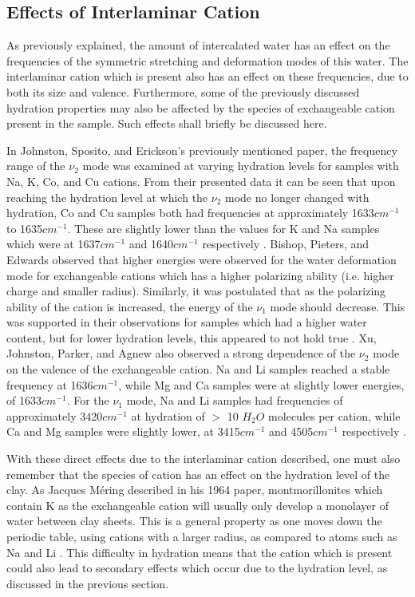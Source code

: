 \subsection{Effects of Interlaminar Cation}
As previously explained, the amount of intercalated water has an effect on the frequencies of the symmetric stretching and deformation modes of this water. The interlaminar cation which is present also has an effect on these frequencies, due to both its size and valence. Furthermore, some of the previously discussed hydration properties may also be affected by the species of exchangeable cation present in the sample. Such effects shall briefly be discussed here.

In Johnston, Sposito, and Erickson's previously mentioned paper, the frequency range of the $\nu_2$ mode was examined at varying hydration levels for samples with Na, K, Co, and Cu cations. From their presented data it can be seen that upon reaching the hydration level at which the $\nu_2$ mode no longer changed with hydration, Co and Cu samples both had frequencies at approximately 1633$cm^{-1}$ to 1635$cm^{-1}$. These are slightly lower than the values for K and Na samples which were at 1637$cm^{-1}$ and 1640$cm^{-1}$ respectively \cite{johnston1992vibrational}. Bishop, Pieters, and Edwards observed that higher energies were observed for the water deformation mode for exchangeable cations which has a higher polarizing ability (i.e. higher charge and smaller radius). Similarly, it was postulated that as the polarizing ability of the cation is increased, the energy of the $\nu_1$ mode should decrease. This was supported in their observations for samples which had a higher water content, but for lower hydration levels, this appeared to not hold true \cite{bishop1994infrared}. Xu, Johnston, Parker, and Agnew also observed a strong dependence of the $\nu_2$ mode on the valence of the exchangeable cation. Na and Li samples reached a stable frequency at 1636$cm^{-1}$, while Mg and Ca samples were at slightly lower energies, of 1633$cm^{-1}$. For the $\nu_1$ mode, Na and Li samples had frequencies of approximately 3420$cm^{-1}$ at hydration of $>$ 10 $H_2O$ molecules per cation, while Ca and Mg samples were slightly lower, at 3415$cm^{-1}$ and 4505$cm^{-1}$ respectively \cite{xu2000infrared}.

With these direct effects due to the interlaminar cation described, one must also remember that the species of cation has an effect on the hydration level of the clay. As Jacques Méring described in his 1964 paper, montmorillonites which contain K as the exchangeable cation will usually only develop a monolayer of water between clay sheets. This is a general property as one moves down the periodic table, using cations with a larger radius, as compared to atoms such as Na and Li \cite{mering1964gonflement}. This difficulty in hydration means that the cation which is present could also lead to secondary effects which occur due to the hydration level, as discussed in the previous section.

